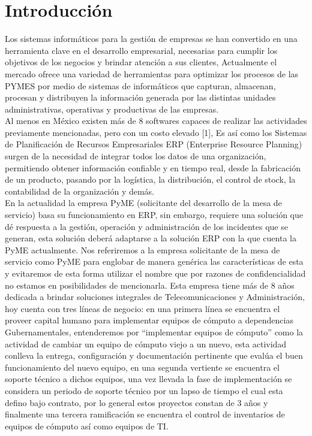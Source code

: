 \chapter*{Introducción}
Los sistemas informáticos para la gestión de empresas se han convertido en una herramienta clave en el desarrollo empresarial, necesarias para cumplir los objetivos de los negocios y brindar atención a sus clientes,  Actualmente el mercado ofrece una variedad de herramientas para optimizar los procesos de las PYMES por medio de sistemas de informáticos que capturan, almacenan, procesan y distribuyen la información generada por las distintas unidades administrativas, operativas y productivas de las empresas.\\

Al menos en México existen más de 8 softwares capaces de realizar las actividades previamente mencionadas, pero con un costo elevado [1], Es así como los Sistemas de Planificación de Recursos Empresariales ERP (Enterprise Resource Planning) surgen de la necesidad de integrar todos los datos de una organización, permitiendo obtener información confiable y en tiempo real, desde la fabricación de un producto, pasando por la logística, la distribución, el control de stock, la contabilidad de la organización y demás.\\

En la actualidad la empresa PyME (solicitante del desarrollo de la mesa de servicio) basa su funcionamiento en ERP, sin embargo, requiere una solución que dé respuesta a la gestión, operación y administración de los incidentes que se generan, esta solución deberá adaptarse a la solución ERP con la que cuenta la PyME actualmente.
Nos referiremos a la empresa solicitante de la mesa de servicio como PyME para englobar de manera genérica las características de esta y evitaremos de esta forma utilizar el nombre que por razones de confidencialidad no estamos en posibilidades de mencionarla. Esta empresa tiene más de 8 años dedicada a brindar soluciones integrales de Telecomunicaciones y Administración, hoy cuenta con tres líneas de negocio: en una primera línea se encuentra el proveer capital humano para implementar equipos de cómputo a dependencias Gubernamentales, entenderemos por “implementar equipos de cómputo” como la actividad de cambiar un equipo de cómputo viejo a un nuevo, esta actividad  conlleva la entrega, configuración y documentación pertinente que evalúa el buen funcionamiento del nuevo equipo, en una segunda vertiente se encuentra el soporte técnico a dichos equipos, una vez llevada la fase de implementación se considera un periodo de soporte técnico por un lapso de tiempo el cual esta defino bajo contrato, por lo general estos proyectos constan de 3 años y finalmente una tercera ramificación se encuentra el control de inventarios de equipos de cómputo así como equipos de TI. \\

